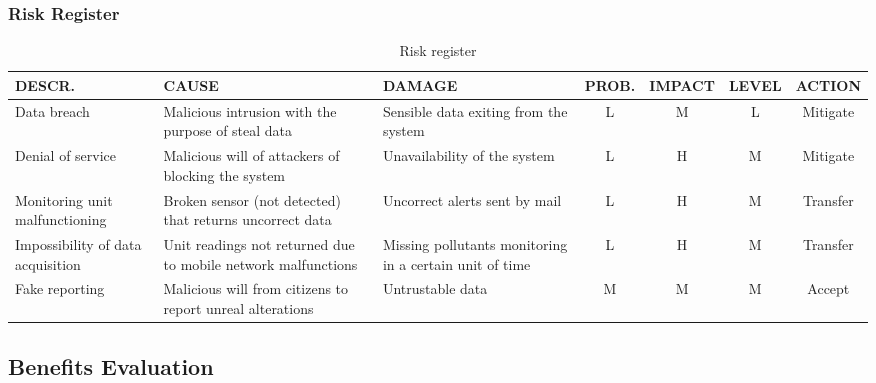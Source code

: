 \subsubsection{Risk Register}
\begin{table}[H]
    \centering
    \begin{tabularx}{\columnwidth}{|X|X|X|c|c|c|c|}
    \hline
    \textbf{DESCR.} & \textbf{CAUSE} & \textbf{DAMAGE} & \textbf{PROB.} & \textbf{IMPACT} & \textbf{LEVEL} & \textbf{ACTION} \\ \hline
    Data breach & Malicious intrusion with the purpose of steal data & Sensible data exiting from the system & \cellcolor{green!25}L & \cellcolor{orange!25}M & \cellcolor{green!25}L & Mitigate \\ \hline
    Denial of service & Malicious will of attackers of blocking the system & Unavailability of the system & \cellcolor{green!25}L & \cellcolor{red!25}H & \cellcolor{orange!25}M & Mitigate \\ \hline
    Monitoring unit malfunctioning & Broken sensor (not detected) that returns uncorrect data & Uncorrect alerts sent by mail & \cellcolor{green!25}L & \cellcolor{red!25}H & \cellcolor{orange!25}M & Transfer \\ \hline
    Impossibility of data acquisition & Unit readings not returned due to mobile network malfunctions & Missing pollutants monitoring in a certain unit of time & \cellcolor{green!25}L & \cellcolor{red!25}H & \cellcolor{orange!25}M & Transfer \\ \hline
    Fake reporting & Malicious will from citizens to report unreal alterations & Untrustable data & \cellcolor{orange!25}M & \cellcolor{orange!25}M & \cellcolor{orange!25}M & Accept \\ \hline
    \end{tabularx}
    \caption{Risk register}
    \label{register}
\end{table}

\pagebreak
\subsection{Benefits Evaluation}
